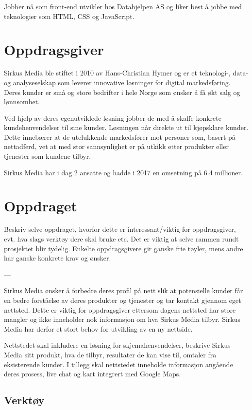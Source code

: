 \documentclass[11pt,a4paper]{report}
\begin{document}
Jobber nå som front-end utvikler hos Datahjelpen AS og liker best å jobbe med teknologier som HTML, CSS og JavaScript.

\section*{Oppdragsgiver}

Sirkus Media ble stiftet i 2010 av Hans-Christian Hymer og er et teknologi-, data- og analyseselskap som leverer innovative løsninger for digital markedsføring. Deres kunder er små og store bedrifter i hele Norge som ønsker å få økt salg og lønnsomhet. 

Ved hjelp av deres egenutviklede løsning jobber de med å skaffe konkrete kundehenvendelser til sine kunder. Løsningen når direkte ut til kjøpsklare kunder. Dette innebærer at de utelukkende markedsfører mot personer som, basert på nettadferd, vet at med stor sannsynlighet er på utkikk etter produkter eller tjenester som kundene tilbyr.

Sirkus Media har i dag 2 ansatte og hadde i 2017 en omsetning på 6.4 millioner. 

\section*{Oppdraget}

Beskriv selve oppdraget, hvorfor dette er interessant/viktig for oppdragsgiver, evt. hva slags verktøy dere skal bruke etc. Det er viktig at selve rammen rundt prosjektet blir tydelig. Enkelte oppdragsgivere gir ganske frie tøyler, mens andre har ganske konkrete krav og ønsker.

---

Sirkus Media ønsker å forbedre deres profil på nett slik at potensielle kunder får en bedre forståelse av deres produkter og tjenester og tar kontakt gjennom eget nettsted. Dette er viktig for oppdragsgiver ettersom dagens nettsted har store mangler og ikke inneholder nok informasjon om hva Sirkus Media tilbyr. Sirkus Media har derfor et stort behov for utvikling av en ny nettside. 

Nettstedet skal inkludere en løsning for skjemahenvendelser, beskrive Sirkus Media sitt produkt, hva de tilbyr, resultater de kan vise til, omtaler fra eksisterende kunder.
I tillegg skal nettstedet inneholde informasjon angående deres prosess, live chat og kart integrert med Google Maps.

\subsection*{Verktøy}
\end{document}
